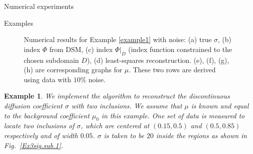 \documentclass[11pt]{article}%
\renewcommand{\_}{{\fontfamily{ptm}\selectfont\textunderscore}}
\theoremstyle{plain}
\numberwithin{equation}{section}
\newtheorem{exam}{Example}
\begin{document}
\begin{section}{Numerical experiments}
\begin{subsection}{Examples}
\begin{figure}[ht!]
\centering
{}
\caption{Numerical results for Example \ref{example1} with noise: (a) true $\sigma$, (b) index $\Phi$ from  DSM, (c) index $\Phi|_D$ (index function constrained to the chosen subdomain $D$), (d) least-squares reconstruction. (e), (f), (g), (h) are corresponding graphs for $\mu$.  These two rows are derived using data with $10\%$ noise.}
\label{Ex1.3_2.main}
\end{figure}
\begin{exam}\label{example2.1}
 We implement the algorithm to reconstruct the discontinuous diffusion coefficient $\sigma$ with two inclusions. We assume that $\mu$ is known and equal to the background coefficient $\mu_0$ in this example. One set of data is measured to locate two inclusions of $\sigma$, which are centered at $(0.15,0.5)$ and $(0.5,0.85)$ respectively and of width $0.05$.  $\sigma$ is taken to be $20$ inside the regions as shown in Fig.~\ref{Ex3sig.sub.1}. 
  \end{exam}

\end{subsection}
\end{section}
\end{document}
